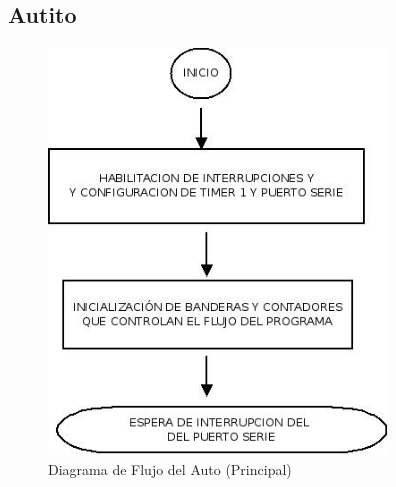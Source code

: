 \documentclass[a4paper,10pt]{article}
\begin{document}
			\subsection{Autito}

				\begin{figure}[!htb]
					\centering
					\includegraphics[width=9cm]{Imagenes/DiagFlujoAuto2.jpg}
					\caption{Diagrama de Flujo del Auto (Principal)} \label{AutoFlujo1}
				\end{figure}
\end{document}
